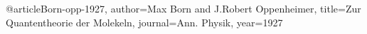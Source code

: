 @article{Born-opp-1927,
	author={Max Born and J.Robert Oppenheimer},
	title={{Zur Quantentheorie der Molekeln}},
	journal={Ann. Physik},
	year={1927}
}